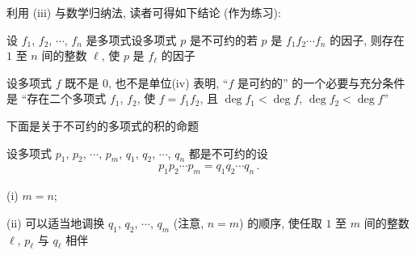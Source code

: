 \begin{remark}
    利用 (iii) 与数学归纳法, 读者可得如下结论 (作为练习):

    设 $f_1$, $f_2$, $\cdots$, $f_n$ 是多项式\period 设多项式 $p$ 是不可约的\period 若 $p$ 是 $f_1 f_2 \cdots f_n$ 的因子, 则存在 $1$ 至 $n$ 间的整数 $\ell$, 使 $p$ 是 $f_{\ell}$ 的因子\period
\end{remark}

\begin{remark}
    设多项式 $f$ 既不是 $0$, 也不是单位\period (iv) 表明, ``$f$ 是可约的'' 的一个必要与充分条件是 ``存在二个多项式 $f_1$, $f_2$, 使 $f = f_1 f_2$, 且 $\deg f_1 < \deg f$, $\deg f_2 < \deg f$''\period
\end{remark}

下面是关于不可约的多项式的积的命题\period

\begin{proposition}
    设多项式 $p_1$, $p_2$, $\cdots$, $p_m$, $q_1$, $q_2$, $\cdots$, $q_n$ 都是不可约的\period 设
    \begin{align*}
        p_1 p_2 \cdots p_m = q_1 q_2 \cdots q_n \period
    \end{align*}

    (i) $m = n$;

    (ii) 可以适当地调换 $q_1$, $q_2$, $\cdots$, $q_m$ (注意, $n = m$) 的顺序, 使任取 $1$ 至 $m$ 间的整数 $\ell$, $p_{\ell}$ 与 $q_{\ell}$ 相伴\period
\end{proposition}

